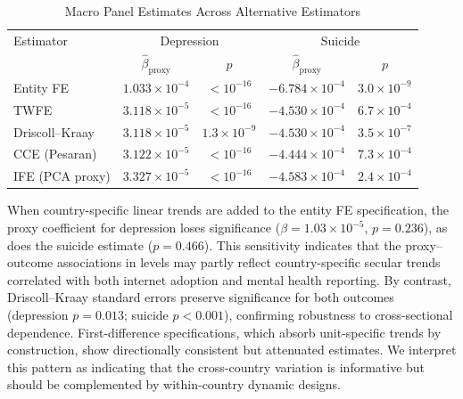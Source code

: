 \documentclass[a4paper,11pt,titlepage]{article}
\begin{document}
\begin{table}[h]
\centering
\caption{Macro Panel Estimates Across Alternative Estimators}\label{tab:cce-ife}
\small
\begin{tabular}{lcccc}
\hline
Estimator & \multicolumn{2}{c}{Depression} & \multicolumn{2}{c}{Suicide} \\
 & $\hat{\beta}_{\text{proxy}}$ & $p$ & $\hat{\beta}_{\text{proxy}}$ & $p$ \\
\hline
Entity FE          & $1.033 \times 10^{-4}$ & $< 10^{-16}$ & $-6.784 \times 10^{-4}$ & $3.0 \times 10^{-9}$ \\
TWFE               & $3.118 \times 10^{-5}$ & $< 10^{-16}$ & $-4.530 \times 10^{-4}$ & $6.7 \times 10^{-4}$ \\
Driscoll--Kraay    & $3.118 \times 10^{-5}$ & $1.3 \times 10^{-9}$ & $-4.530 \times 10^{-4}$ & $3.5 \times 10^{-7}$ \\
CCE (Pesaran)      & $3.122 \times 10^{-5}$ & $< 10^{-16}$ & $-4.444 \times 10^{-4}$ & $7.3 \times 10^{-4}$ \\
IFE (PCA proxy)    & $3.327 \times 10^{-5}$ & $< 10^{-16}$ & $-4.583 \times 10^{-4}$ & $2.4 \times 10^{-4}$ \\
\hline
\end{tabular}
\end{table}

When country-specific linear trends are added to the entity FE specification, the proxy coefficient for depression loses significance ($\beta = 1.03 \times 10^{-5}$, $p = 0.236$), as does the suicide estimate ($p = 0.466$). This sensitivity indicates that the proxy--outcome associations in levels may partly reflect country-specific secular trends correlated with both internet adoption and mental health reporting. By contrast, Driscoll--Kraay standard errors preserve significance for both outcomes (depression $p = 0.013$; suicide $p < 0.001$), confirming robustness to cross-sectional dependence. First-difference specifications, which absorb unit-specific trends by construction, show directionally consistent but attenuated estimates. We interpret this pattern as indicating that the cross-country variation is informative but should be complemented by within-country dynamic designs.
\end{document}
